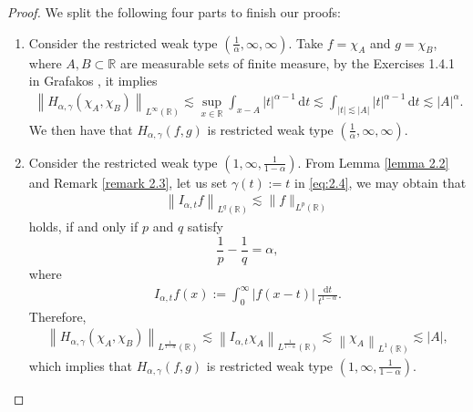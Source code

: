 \documentclass[11pt, twoside, leqno]{article}
\theoremstyle{definition}
\numberwithin{equation}{section}
\begin{document}
\begin{proof} We split the following four parts to finish our proofs:
\begin{enumerate}
  \item[$\star$] Consider the restricted weak type $({\frac{1}{\alpha}},\infty,\infty)$. Take $f=\chi_{A}$ and $g=\chi_{B}$, where $A, B\subset\mathbb{R}$ are measurable sets of finite measure, by the Exercises 1.4.1 in Grafakos \cite{Gra}, it implies
  \begin{align}\label{eq:2.6}
  \left\|H_{\alpha,\gamma}(\chi_{A},\chi_{B})\right\|_{L^{\infty}(\mathbb{R})}
  \lesssim \sup\limits_{x\in{\mathbb{R}}} \int_{x-A} |t|^{\alpha-1}\,\textrm{d}t \lesssim \int_{ |t|\lesssim |A| } |t|^{\alpha-1}\,\textrm{d}t \lesssim|A|^{\alpha}.
  \end{align}
  We then have that $H_{\alpha,\gamma}(f,g)$ is restricted weak type $({\frac{1}{\alpha}},\infty,\infty)$.

  \item[$\star$] Consider the restricted weak type $(1,\infty,{\frac{1}{1-\alpha}})$. From Lemma \ref{lemma 2.2} and Remark \ref{remark 2.3}, let us set $\gamma(t):=t$ in \eqref{eq:2.4}, we may obtain that
  \begin{align*}
\left\|I_{\alpha,t}f\right\|_{L^{q}(\mathbb{R})} \lesssim \|f\|_{L^{p}(\mathbb{R})}
  \end{align*}
holds, if and only if $p$ and $q$ satisfy
$${\frac{1}{p}}-{\frac{1}{q}}=\alpha,$$
where
\begin{align*}
I_{\alpha,t}f(x):=\int_{0}^{\infty}\left|f(x-t)\right|\,\frac{\textrm{d}t}{t^{1-\alpha}}.
 \end{align*}
Therefore,
\begin{align*}
  \left\|H_{\alpha,\gamma}(\chi_{A},\chi_{B})\right\|_{L^{\frac{1}{1-\alpha}}(\mathbb{R})}
  \lesssim \left\|I_{\alpha,t}\chi_{A}\right\|_{L^{\frac{1}{1-\alpha}}(\mathbb{R})}\lesssim  \left\|\chi_{A}\right\|_{L^{1}(\mathbb{R})} \lesssim|A|,
  \end{align*}
 which implies that $H_{\alpha,\gamma}(f,g)$ is restricted weak type $(1,\infty,{\frac{1}{1-\alpha}})$.


\end{enumerate}
\end{proof}
\end{document}

